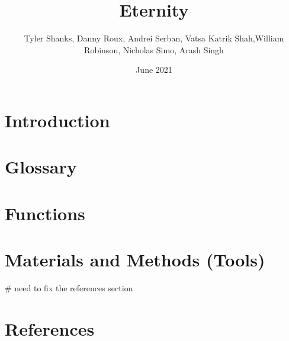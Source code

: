 \documentclass[titlepage]{article}
\begin{document}
\title{Eternity}
\author{Tyler Shanks, Danny Roux, Andrei Serban, Vatsa Katrik Shah,\newpage William Robinson, Nicholas Simo, Arash Singh}
\date{June 2021}
\maketitle

\fancyfoot{\thepage}

\tableofcontents
\newpage

\section{Introduction}
\blindtext

\section{Glossary}
\blindtext

\section{Functions}
\blindtext

\section{Materials and Methods (Tools)}
\blindtext

# need to fix the references section
\section{References}


\end{document}
